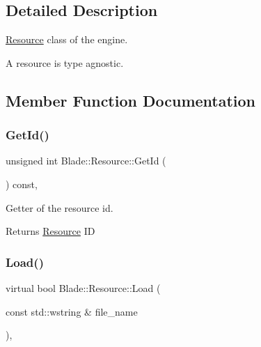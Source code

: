 \subsection{Detailed Description}
\hyperlink{class_blade_1_1_resource}{Resource} class of the engine. 

A resource is type agnostic. 

\subsection{Member Function Documentation}
\mbox{\label{class_blade_1_1_resource_a2346c235601b0a703287bff9ad2c3432}} 
\subsubsection{\texorpdfstring{Get\+Id()}{GetId()}}
{\footnotesize\ttfamily unsigned int Blade\+::\+Resource\+::\+Get\+Id (\begin{DoxyParamCaption}{ }\end{DoxyParamCaption}) const\hspace{0.3cm}{\ttfamily [inline]}, {\ttfamily [noexcept]}}



Getter of the resource id. 

\begin{DoxyReturn}{Returns}
\hyperlink{class_blade_1_1_resource}{Resource} ID 
\end{DoxyReturn}
\mbox{\label{class_blade_1_1_resource_ad89ab00a3b81df1338a8310ec92c5cff}} 
\subsubsection{\texorpdfstring{Load()}{Load()}}
{\footnotesize\ttfamily virtual bool Blade\+::\+Resource\+::\+Load (\begin{DoxyParamCaption}\item[{const std\+::wstring \&}]{file\+\_\+name }\end{DoxyParamCaption})\hspace{0.3cm}{\ttfamily [pure virtual]}, {\ttfamily [noexcept]}}



